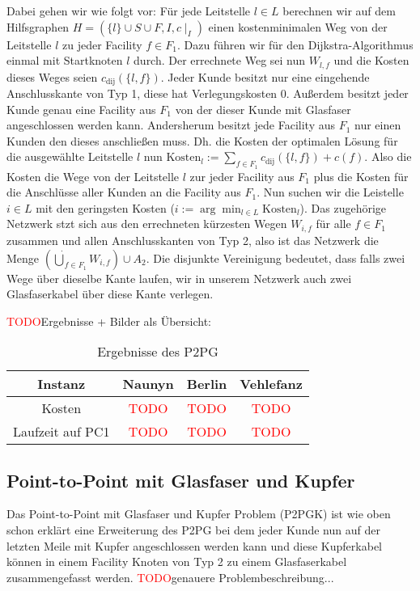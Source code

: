 \documentclass[11pt,a4paper]{article}
\newcommand{\TODO}{\textcolor{red}{TODO}}
\theoremstyle{my_th_style1}
\begin{document}
Dabei gehen wir wie folgt vor:
Für jede Leitstelle $ l \in L$ berechnen wir auf dem Hilfsgraphen $H=(\{l\} \cup S \cup F , I,c\mid_I)$ einen kostenminimalen Weg von der Leitstelle $l$ zu jeder Facility $f \in F_1$. Dazu führen wir für den Dijkstra-Algorithmus einmal mit Startknoten $l$ durch. Der errechnete Weg sei nun $W_{l,f}$ und die Kosten dieses Weges seien $c_{\text{dij}}(\{l,f\})$. 
Jeder Kunde besitzt nur eine eingehende Anschlusskante von Typ 1, diese hat Verlegungskosten 0. 
Außerdem besitzt jeder Kunde genau eine Facility aus $F_1$ von der dieser Kunde mit Glasfaser angeschlossen werden kann. 
Andersherum besitzt jede Facility aus $F_1$ nur einen Kunden den dieses anschließen muss. 
Dh. die Kosten der optimalen Lösung für die ausgewählte Leitstelle $l$ nun $\text{Kosten}_l:=\displaystyle\sum_{f \in F_1} c_{\text{dij}}(\{l,f\}) + c(f)$. Also die Kosten die Wege von der Leitstelle $l$ zur jeder Facility aus $F_1$ plus die Kosten für die Anschlüsse aller Kunden an die Facility aus $F_1$.
Nun suchen wir die Leistelle $i \in L$ mit den geringsten Kosten ($i:=\arg \displaystyle\min_{l \in L} \text{Kosten}_l$). Das zugehörige Netzwerk stzt sich aus den errechneten kürzesten Wegen $W_{i,f}$ für alle $f \in F_1$ zusammen und allen Anschlusskanten von Typ 2, also ist das Netzwerk die Menge $(\dot{\bigcup}_{f \in F_1 }W_{i,f}) \cup A_2 $. Die disjunkte Vereinigung bedeutet, dass falls zwei Wege über dieselbe Kante laufen, wir in unserem Netzwerk auch zwei Glasfaserkabel über diese Kante verlegen.


\TODO Ergebnisse + Bilder als Übersicht:
\begin{table}[h]
	\centering
	\begin{tabular}{c|c|c|c}
		 Instanz & Naunyn & Berlin & Vehlefanz \\	
		\hline
		Kosten & \TODO & \TODO & \TODO\\
		Laufzeit auf PC1 & \TODO & \TODO & \TODO\\
	\end{tabular}
	\label{P2PG}
	\caption{Ergebnisse des P2PG} 
\end{table}
\vspace{2cm}


\subsection{Point-to-Point mit Glasfaser und Kupfer}
Das Point-to-Point mit Glasfaser und Kupfer Problem (P2PGK) ist wie oben schon erklärt eine Erweiterung des P2PG bei dem jeder Kunde nun auf der letzten Meile mit Kupfer angeschlossen werden kann und diese Kupferkabel können in einem Facility Knoten von Typ 2 zu einem Glasfaserkabel zusammengefasst werden. \TODO genauere Problembeschreibung...
\end{document}
